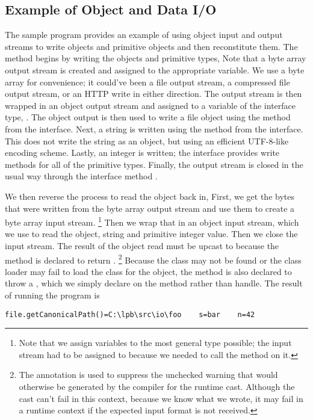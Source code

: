 \subsection{Example of Object and Data I/O}

The sample program  provides an example of using object
input and output streams to write objects and primitive objects and
then reconstitute them.  The  method begins by writing
the objects and primitive types,
%
%
Note that a byte array output stream is created and assigned to the
appropriate variable.  We use a byte array for convenience; it
could've been a file output stream, a compressed file output stream,
or an HTTP write in either direction.  The output stream is then
wrapped in an object output stream and assigned to a variable of the
interface type, .  The object output is then used
to write a file object using the  method from the
 interface.  Next, a string is written using the
 method from the  interface.
This does not write the string as an object, but using an efficient
UTF-8-like encoding scheme.  Lastly, an integer is written; the
 interface provides write methods for all of the
primitive types.  Finally, the output stream is closed in the usual
way through the  interface method .

We then reverse the process to read the object back in,
%
%
First, we get the bytes that were written from the byte array
output stream and use them to create a byte array input stream.%
%
\footnote{Note that we assign variables to the most general type possible;
the input stream had to be assigned to 
because we needed to call the  method on it.}
%
Then we wrap that in an object input stream, which we use to read the
object, string and primitive integer value.  Then we close the input
stream.  The result of the object read must be upcast to 
because the  method is declared to return
.%
%
\footnote{The \code{\@SuppressWarnings} annotation is used 
to suppress the unchecked warning that would otherwise be generated
by the compiler for the runtime cast.  Although the cast can't
fail in this context, because we know what we wrote, it may fail
in a runtime context if the expected input format is not received.}
%
Because the class may not be found or the class loader may fail to
load the class for the object, the  method is also
declared to throw a , which we simply
declare on the  method rather than handle.
%
The result of running the program is
%
\begin{verbatim}
file.getCanonicalPath()=C:\lpb\src\io\foo    s=bar    n=42
\end{verbatim}



